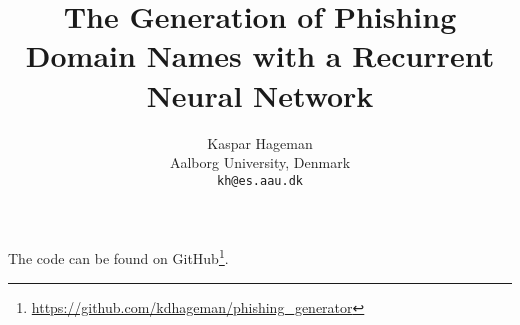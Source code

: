 \documentclass{article}
\title{The Generation of Phishing Domain Names with a Recurrent Neural Network}
\author{
Kaspar Hageman \\
Aalborg University, Denmark \\
{\tt kh@es.aau.dk}
}
\begin{document}
\maketitle






The code can be found on GitHub\footnote{\url{https://github.com/kdhageman/phishing_generator}}.
\end{document}
